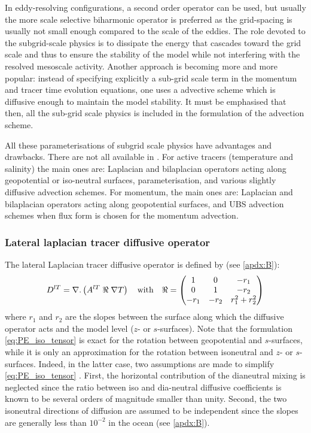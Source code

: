 \documentclass[../main/NEMO_manual]{subfiles}
\begin{document}
In eddy-resolving configurations, a second order operator can be used,
but usually the more scale selective biharmonic operator is preferred as
the grid-spacing is usually not small enough compared to the scale of the eddies.
The role devoted to the subgrid-scale physics is to dissipate the energy that
cascades toward the grid scale and thus to ensure the stability of the model while
not interfering with the resolved mesoscale activity.
Another approach is becoming more and more popular:
instead of specifying explicitly a sub-grid scale term in the momentum and tracer time evolution equations,
one uses a advective scheme which is diffusive enough to maintain the model stability.
It must be emphasised that then, all the sub-grid scale physics is included in the formulation of
the advection scheme.

All these parameterisations of subgrid scale physics have advantages and drawbacks.
There are not all available in \NEMO. For active tracers (temperature and salinity) the main ones are:
Laplacian and bilaplacian operators acting along geopotential or iso-neutral surfaces,
\citet{Gent1990} parameterisation, and various slightly diffusive advection schemes.
For momentum, the main ones are: Laplacian and bilaplacian operators acting along geopotential surfaces,
and UBS advection schemes when flux form is chosen for the momentum advection.

\subsubsection{Lateral laplacian tracer diffusive operator}

The lateral Laplacian tracer diffusive operator is defined by (see \autoref{apdx:B}):
\begin{equation}
  \label{eq:PE_iso_tensor}
  D^{lT} = \nabla \mathbf{.} \left( A^{lT} \; \Re \; \nabla T \right) \quad \text{with} \quad
  \Re =
    \begin{pmatrix}
      1    & 0    & -r_1          \\
      0    & 1    & -r_2          \\
      -r_1 & -r_2 & r_1^2 + r_2^2 \\
    \end{pmatrix}
\end{equation}
where $r_1$ and $r_2$ are the slopes between the surface along which the diffusive operator acts and
the model level (\eg $z$- or $s$-surfaces).
Note that the formulation \autoref{eq:PE_iso_tensor} is exact for
the rotation between geopotential and $s$-surfaces,
while it is only an approximation for the rotation between isoneutral and $z$- or $s$-surfaces.
Indeed, in the latter case, two assumptions are made to simplify \autoref{eq:PE_iso_tensor} \citep{Cox1987}.
First, the horizontal contribution of the dianeutral mixing is neglected since the ratio between iso and
dia-neutral diffusive coefficients is known to be several orders of magnitude smaller than unity.
Second, the two isoneutral directions of diffusion are assumed to be independent since
the slopes are generally less than $10^{-2}$ in the ocean (see \autoref{apdx:B}).
\end{document}
